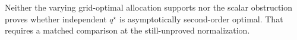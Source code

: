 Neither the varying grid-optimal allocation supports nor the scalar obstruction proves whether independent \(q^\star\) is asymptotically second-order optimal.  That requires a matched comparison at the still-unproved normalization.